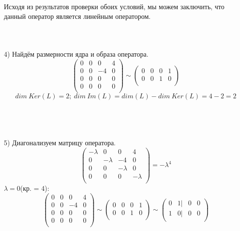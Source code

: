 \documentclass{article}
\begin{document}
Исходя из результатов проверки обоих условий, мы можем заключить, что данный оператор является линейным оператором.
\\ \\
\\ \\
4) Найдём размерности ядра и образа оператора.\\
\begin{equation*}
    \begin{pmatrix}
        0 & 0 & 0 & 4 \\
        0 & 0 & -4 & 0 \\
        0 & 0 & 0 & 0 \\
        0 & 0 & 0 & 0 \\
        \end{pmatrix}\sim 
        \begin{pmatrix}
            0 & 0 & 0 & 1 \\
            0 & 0 & 1 & 0 \\
            \end{pmatrix}
\end{equation*}
\begin{equation*}
    dim\ Ker(L) = 2;\ dim\ Im(L)= dim(L)- dim\ Ker(L) = 4 -2=2
\end{equation*}
\\ \\
\\ \\
5) Диагонализуем матрицу оператора.\\
\begin{equation*}
    \begin{pmatrix}
        -\lambda & 0 & 0 & 4 \\
        0 & -\lambda & -4 & 0 \\
        0 & 0 & -\lambda & 0 \\
        0 & 0 & 0 & -\lambda \\
        \end{pmatrix}= -\lambda^4
\end{equation*}
$\lambda=0 $(кр. = 4):
\begin{equation*}
    \begin{pmatrix}
        0 & 0 & 0 & 4 \\
        0 & 0 & -4 & 0 \\
        0 & 0 & 0 & 0 \\
        0 & 0 & 0 & 0 \\
        \end{pmatrix}\sim 
        \begin{pmatrix}
            0 & 0 & 0 & 1 \\
            0 & 0 & 1 & 0 \\
        \end{pmatrix}\sim 
        \begin{pmatrix}
            0 & 1| & 0 & 0 \\
            1 & 0| & 0 & 0 \\
        \end{pmatrix}
\end{equation*}
\end{document}
